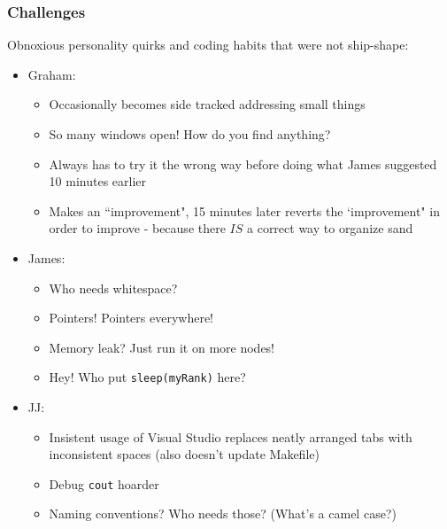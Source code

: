 \documentclass[usernames,dvipsnames]{beamer}
\begin{document}
\begin{frame}	
	\frametitle{Challenges}
	
	\vspace{-5pt}
	
	\begin{alertblock}{\small Obnoxious personality quirks and coding habits that were not ship-shape:}
		\begin{itemize}
			\setlength\itemsep{0.5pt}
			\item Graham: \\ \vspace{-5pt}
				\begin{itemize}
					\small
					\setlength\itemsep{0.1pt}
					\item Occasionally becomes side tracked addressing small things
					\item So many windows open! How do you find anything?
					\item Always has to try it the wrong way before doing what James suggested 10 minutes earlier
					\item Makes an ``improvement", 15 minutes later reverts the `improvement" in order to improve - because there $IS$ a correct way to organize sand \vspace{-5pt}
				\end{itemize}
			\item James: \\ \vspace{-5pt}
				\begin{itemize}
					\setlength\itemsep{0.1pt}
					\item Who needs whitespace?
					\item Pointers! Pointers everywhere!
					\item Memory leak? Just run it on more nodes!
					\item Hey! Who put \texttt{sleep(myRank)} here? \vspace{-5pt}
				\end{itemize}
			\item JJ: \\ \vspace{-5pt}
				\begin{itemize}
					\small
					\setlength\itemsep{0.1pt}
					\item Insistent usage of Visual Studio replaces neatly arranged tabs with inconsistent spaces (also doesn't update Makefile)
					\item Debug \texttt{cout} hoarder
					\item Naming conventions? Who needs those? (What's a camel case?)
				\end{itemize}
		\end{itemize}
	\end{alertblock}

\end{frame}
\end{document}
